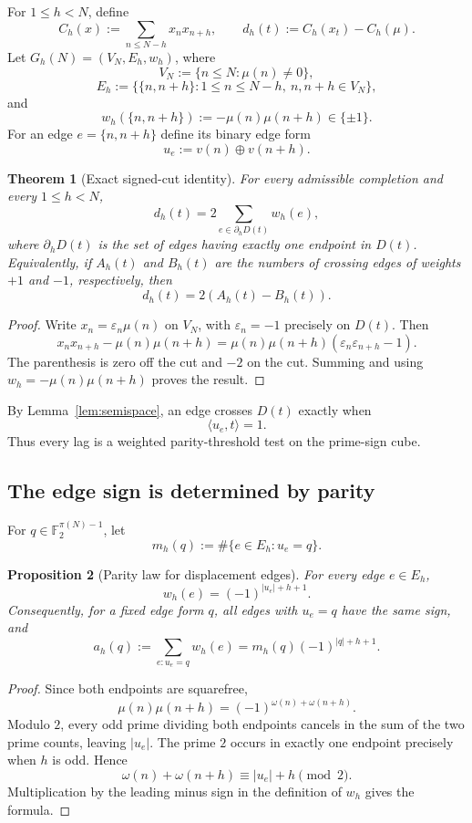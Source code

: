 \documentclass[11pt]{article}
\newtheorem{theorem}{Theorem}[section]
\newtheorem{proposition}[theorem]{Proposition}
\theoremstyle{definition}
\theoremstyle{remark}
\newcommand{\Ftwo}{\mathbb F_2}
\begin{document}
For $1\le h<N$, define
\[
 C_h(x):=\sum_{n\le N-h}x_nx_{n+h},
 \qquad
 d_h(t):=C_h(x_t)-C_h(\mu).
\]
Let $G_h(N)=(V_N,E_h,w_h)$, where
\[
 V_N:=\{n\le N:\mu(n)\ne0\},
\]
\[
 E_h:=\{\{n,n+h\}:1\le n\le N-h,\ n,n+h\in V_N\},
\]
and
\[
 w_h(\{n,n+h\}):=-\mu(n)\mu(n+h)\in\{\pm1\}.
\]
For an edge $e=\{n,n+h\}$ define its binary edge form
\[
 u_e:=v(n)\oplus v(n+h).
\]

\begin{theorem}[Exact signed-cut identity]\label{thm:cut}
For every admissible completion and every $1\le h<N$,
\[
 \boxed{
 d_h(t)=2\sum_{e\in\partial_hD(t)}w_h(e),
 }
\]
where $\partial_hD(t)$ is the set of edges having exactly one endpoint in $D(t)$.
Equivalently, if $A_h(t)$ and $B_h(t)$ are the numbers of crossing edges of weights $+1$ and $-1$, respectively, then
\[
 \boxed{d_h(t)=2(A_h(t)-B_h(t)).}
\]
\end{theorem}

\begin{proof}
Write $x_n=\varepsilon_n\mu(n)$ on $V_N$, with $\varepsilon_n=-1$ precisely on $D(t)$.  Then
\[
 x_nx_{n+h}-\mu(n)\mu(n+h)
 =\mu(n)\mu(n+h)(\varepsilon_n\varepsilon_{n+h}-1).
\]
The parenthesis is zero off the cut and $-2$ on the cut.  Summing and using $w_h=-\mu(n)\mu(n+h)$ proves the result.
\end{proof}

By Lemma~\ref{lem:semispace}, an edge crosses $D(t)$ exactly when
\[
 \langle u_e,t\rangle=1.
\]
Thus every lag is a weighted parity-threshold test on the prime-sign cube.

\subsection{The edge sign is determined by parity}

For $q\in\Ftwo^{\pi(N)-1}$, let
\[
 m_h(q):=\#\{e\in E_h:u_e=q\}.
\]

\begin{proposition}[Parity law for displacement edges]\label{prop:parity-law}
For every edge $e\in E_h$,
\[
 \boxed{
 w_h(e)=(-1)^{|u_e|+h+1}.
 }
\]
Consequently, for a fixed edge form $q$, all edges with $u_e=q$ have the same sign, and
\[
 \boxed{
 a_h(q):=\sum_{e:u_e=q}w_h(e)
 =m_h(q)(-1)^{|q|+h+1}.
 }
\]
\end{proposition}

\begin{proof}
Since both endpoints are squarefree,
\[
 \mu(n)\mu(n+h)=(-1)^{\omega(n)+\omega(n+h)}.
\]
Modulo $2$, every odd prime dividing both endpoints cancels in the sum of the two prime counts, leaving $|u_e|$.  The prime $2$ occurs in exactly one endpoint precisely when $h$ is odd.  Hence
\[
 \omega(n)+\omega(n+h)\equiv |u_e|+h\pmod2.
\]
Multiplication by the leading minus sign in the definition of $w_h$ gives the formula.
\end{proof}
\end{document}
